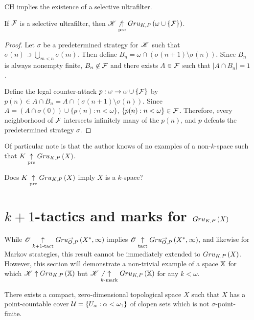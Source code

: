 \begin{thm}
  CH implies the existence of a selective ultrafilter.
  \cite{MR0080902}
\end{thm}

\begin{thm}
  If $\mathcal{F}$ is a selective ultrafilter, then
  $\mathscr{K}\not\underset{\text{pre}}{\uparrow} Gru_{K,P}\left({\omega\cup\{\mathcal{F}\}}\right)$.
\end{thm}

\begin{proof}
  Let $\sigma$ be a predetermined strategy for $\mathscr{K}$ such that
  $\sigma(n)\supset\bigcup_{m<n}\sigma(m)$.
  Then define $B_n=\omega\cap(\sigma(n+1)\setminus\sigma(n))$. Since $B_n$
  is always nonempty finite, $B_n\not\in\mathcal{F}$ and there exists $A\in \mathcal{F}$
  such that $|A\cap B_n|=1$.

  Define the legal counter-attack $p:\omega\to\omega\cup\{\mathcal{F}\}$ by
  $p(n)\in A\cap B_n=A\cap(\sigma(n+1)\setminus\sigma(n))$. Since
  $A=(A\cap\sigma(0))\cup\{p(n):n<\omega\}$, $\{p(n):n<\omega\}\in\mathcal{F}$.
  Therefore, every neighborhood of $\mathcal{F}$ intersects infinitely many of
  the $p(n)$, and $p$ defeats the predetermined strategy $\sigma$.
\end{proof}

Of particular note is that the author knows of no examples of a
non-$k$-space such that $K\underset{\text{pre}}{\uparrow}Gru_{K,P}\left({X}\right)$.

\begin{ques}
  Does $K\underset{\text{pre}}{\uparrow}Gru_{K,P}\left({X}\right)$ imply $X$ is a $k$-space?
\end{ques}


\section{$k+1$-tactics and marks for $Gru_{K,P}\left({X}\right)$}

While $\mathscr{O}\underset{k+1\text{-tact}}{\uparrow}Gru_{O,P}^{\to}\left({X^*},{\infty}\right)$ implies
$\mathscr{O}\underset{\text{tact}}{\uparrow}Gru_{O,P}^{\to}\left({X^*},{\infty}\right)$, and likewise for Markov
strategies, this result cannot be
immediately extended to $Gru_{K,P}\left({X}\right)$. However, this section will
demonstrate a non-trivial example of a space $\mathbb{X}$ for which
$\mathscr{K}\uparrow Gru_{K,P}\left({\mathbb{X}}\right)$ but $\mathscr{K}\not\underset{k\text{-mark}}{\uparrow}Gru_{K,P}\left({\mathbb{X}}\right)$
for any $k<\omega$.

\begin{thm}
  There exists a compact, zero-dimensional topological space $X$
  such that $X$ has a point-countable cover
  $\mathcal{U} = \{U_\alpha : \alpha<\omega_1\}$ of
  clopen sets which is not $\sigma$-point-finite.
\end{thm}

